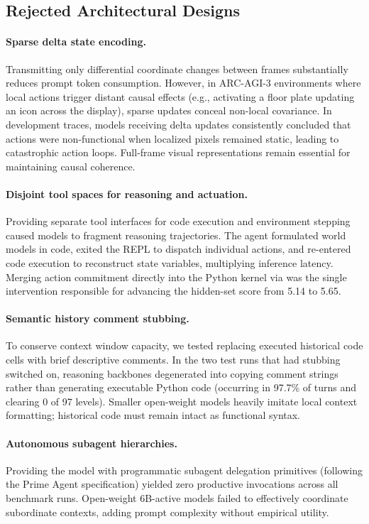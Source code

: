 \subsection{Rejected Architectural Designs}

\paragraph{Sparse delta state encoding.}
Transmitting only differential coordinate changes between frames substantially reduces prompt token consumption. However, in ARC-AGI-3 environments where local actions trigger distant causal effects (e.g., activating a floor plate updating an icon across the display), sparse updates conceal non-local covariance. In development traces, models receiving delta updates consistently concluded that actions were non-functional when localized pixels remained static, leading to catastrophic action loops. Full-frame visual representations remain essential for maintaining causal coherence.

\paragraph{Disjoint tool spaces for reasoning and actuation.}
Providing separate tool interfaces for code execution and environment stepping caused models to fragment reasoning trajectories. The agent formulated world models in code, exited the REPL to dispatch individual actions, and re-entered code execution to reconstruct state variables, multiplying inference latency. Merging action commitment directly into the Python kernel via  was the single intervention responsible for advancing the hidden-set score from 5.14 to 5.65.

\paragraph{Semantic history comment stubbing.}
To conserve context window capacity, we tested replacing executed historical code cells with brief descriptive comments. In the two test runs that had stubbing switched on, reasoning backbones degenerated into copying comment strings rather than generating executable Python code (occurring in 97.7\% of turns and clearing 0 of 97 levels). Smaller open-weight models heavily imitate local context formatting; historical code must remain intact as functional syntax.

\paragraph{Autonomous subagent hierarchies.}
Providing the model with programmatic subagent delegation primitives (following the Prime Agent specification) yielded zero productive invocations across all benchmark runs. Open-weight 6B-active models failed to effectively coordinate subordinate contexts, adding prompt complexity without empirical utility.

